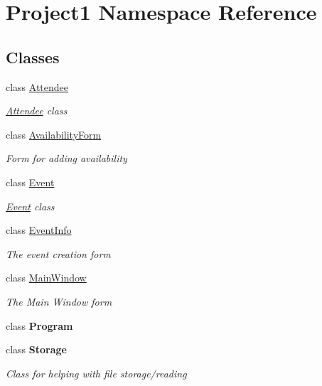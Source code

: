 \hypertarget{namespace_project1}{}\section{Project1 Namespace Reference}
\label{namespace_project1}
\subsection*{Classes}
\begin{DoxyCompactItemize}
\item 
class \hyperlink{class_project1_1_1_attendee}{Attendee}
\begin{DoxyCompactList}\small\item\em \hyperlink{class_project1_1_1_attendee}{Attendee} class \end{DoxyCompactList}\item 
class \hyperlink{class_project1_1_1_availability_form}{Availability\+Form}
\begin{DoxyCompactList}\small\item\em Form for adding availability \end{DoxyCompactList}\item 
class \hyperlink{class_project1_1_1_event}{Event}
\begin{DoxyCompactList}\small\item\em \hyperlink{class_project1_1_1_event}{Event} class \end{DoxyCompactList}\item 
class \hyperlink{class_project1_1_1_event_info}{Event\+Info}
\begin{DoxyCompactList}\small\item\em The event creation form \end{DoxyCompactList}\item 
class \hyperlink{class_project1_1_1_main_window}{Main\+Window}
\begin{DoxyCompactList}\small\item\em The Main Window form \end{DoxyCompactList}\item 
class {\bfseries Program}
\item 
class {\bfseries Storage}
\begin{DoxyCompactList}\small\item\em Class for helping with file storage/reading \end{DoxyCompactList}\end{DoxyCompactItemize}
